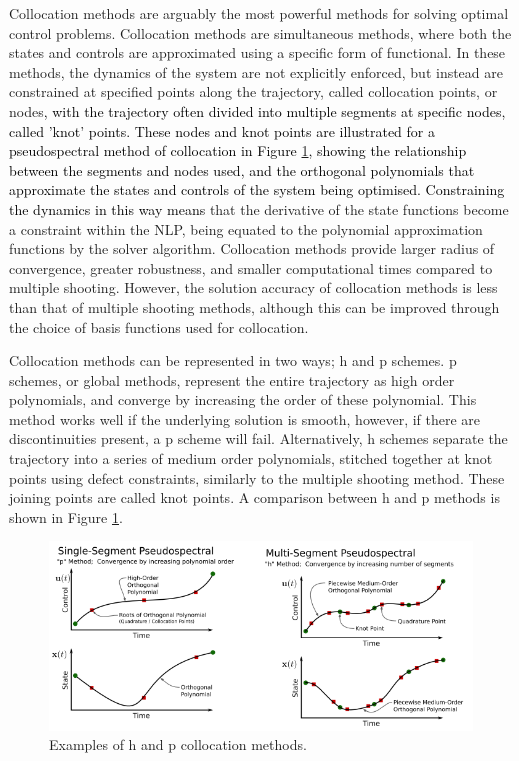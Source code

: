 Collocation methods are arguably the most powerful methods for solving optimal control problems\cite{Rao2009}. Collocation methods are simultaneous methods, where both the states and controls are approximated using a specific form of functional\cite{Kelly2015,Rao2009}. In these methods, the dynamics of the system are not explicitly enforced, but instead are constrained at specified points along the trajectory, called collocation points, or nodes\cite{Kelly2015}\textcolor{black}{, with the trajectory often divided into multiple segments at specific nodes, called 'knot' points. These nodes and knot points are illustrated for a pseudospectral method of collocation in Figure \ref{fig:HPExamples}, showing the relationship between the segments and nodes used, and the orthogonal polynomials that approximate the states and controls of the system being optimised. Constraining the dynamics in this way means} that the derivative of the state functions become a constraint within the NLP, being equated to the polynomial approximation functions by the solver algorithm. 
Collocation methods provide larger radius of convergence, greater robustness, and smaller computational times compared to multiple shooting\cite{Fasano2013}. However, the solution accuracy of collocation methods is less than that of multiple shooting methods\cite{Fasano2013}, although this can be improved through the choice of basis functions used for collocation\cite{Rao2009}.

Collocation methods can be represented in two ways; \textsf{h} and \textsf{p} schemes\cite{Kelly2015}. \textsf{p} schemes, or global methods, represent the entire trajectory as high order polynomials, and converge by increasing the order of these polynomial\cite{Kelly2015}. This method works well if the underlying solution is smooth, however, if there are discontinuities present, a \textsf{p} scheme will fail\cite{Kelly2015}. Alternatively, \textsf{h} schemes separate the trajectory into a series of medium order polynomials, stitched together at knot points using defect constraints, similarly to the multiple shooting method\cite{Kelly2015,Rao2009,Ross2004}. These joining points are called knot points\cite{Kelly2015,Ross2004}. A comparison between \textsf{h} and \textsf{p} methods is shown in Figure \ref{fig:HPExamples}.

\begin{figure}[ht]
	\centering
	\includegraphics[width=0.9\linewidth]{figures/2_literature-review/HPExamples}
	\caption{Examples of \textsf{h} and \textsf{p} collocation methods\cite{Kelly2015}.}
	\label{fig:HPExamples}
\end{figure}

